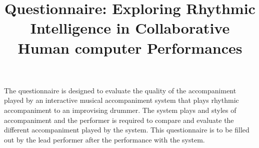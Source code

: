 \documentclass[a4paper,10pt,BCOR10mm,oneside,headsepline]{scrartcl}
\begin{document}
\title{ Questionnaire: Exploring Rhythmic Intelligence in Collaborative Human computer Performances}
\nodate{}

\maketitle

\noindent The questionnaire is designed to evaluate the quality of the accompaniment played by an interactive musical accompaniment system that plays rhythmic accompaniment to an improvising drummer.
The system plays and styles of accompaniment and the performer is required to compare and evaluate the different accompaniment played by the system. 
This questionnaire is to be filled out by the lead performer after the performance with the system.



\end{document}
